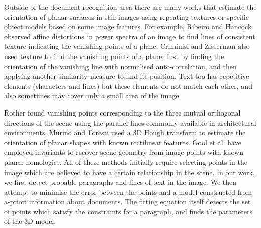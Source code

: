 \documentclass{elsart}   %
\begin{document}
Outside of the document recognition area there are  many works that
estimate the orientation of planar surfaces in still images 
using  repeating textures or specific object models based on some image features.
For example, Ribeiro and Hancock \cite{ribeiro}
observed affine distortions in power spectra of an image to find lines of
consistent texture indicating the vanishing points of a plane. Criminisi and
Zisserman \cite{zisserman} also used texture to find the vanishing points of a
plane,  first by finding the orientation of the vanishing line with normalised
auto-correlation, and then applying another similarity measure to find its position.
Text too has repetitive elements (characters and lines) but
these elements do not match each other, and also sometimes may cover only a
small area of the image.



Rother \cite{rother0} found vanishing points  corresponding  to the three mutual
orthogonal directions of the scene using the parallel lines commonly
available in architectural environments.
Murino and
Foresti \cite{MURIN} used a 3D Hough transform to estimate the orientation of
planar shapes with known rectilinear features.
Gool et al. \cite{vangool98planar} have employed invariants to recover scene geometry
from image points with known planar homologies.
All of these methods initially require selecting points in the image which are
believed to have a certain relationship in the scene.
In our work, we first detect probable paragraphs and lines of text in the image.
We then attempt to minimise the error between the points and a model constructed from
a-priori information about documents.
The fitting equation itself detects the set of points which satisfy the constraints for
a paragraph, and finds the parameters of the 3D model.
\end{document}
